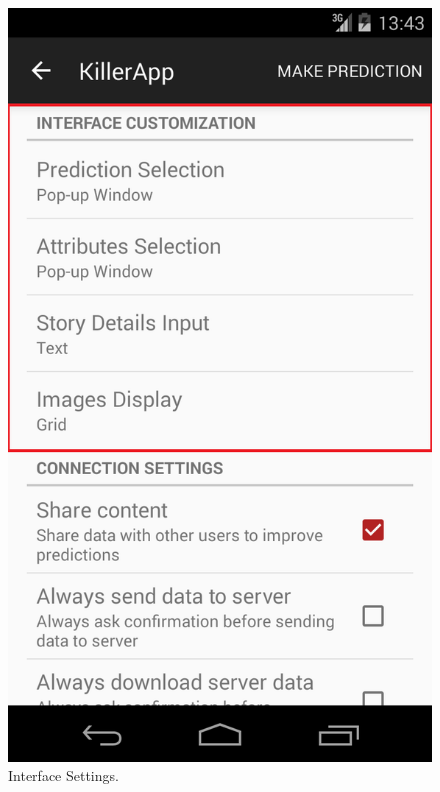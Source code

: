 \documentclass{mproj}
\begin{document}
\begin{figure}[h]
	\centering
		\includegraphics[width=\linewidth]{images/settings_interface}
		\caption{Interface Settings.}
		\label{fig:settings_interface}		
	\endminipage\hfill

\end{figure}
\end{document}
